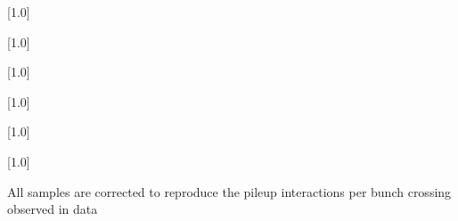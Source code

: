 \begin{table}[!p]
 \centering
{}
 \scriptsize
 \scalebox{.7}[1.0]{}
\label{datasets_dm_scalarw}
\end{table}

\begin{table}[!p]
 \centering
{}
 \scriptsize
 \scalebox{.7}[1.0]{}
\label{datasets_dm_pseudoscalar}
\end{table}

\begin{table}[!p]
 \centering
{}
 \scriptsize
 \scalebox{.7}[1.0]{}
\label{datasets_dm_bbar_pseudoscalar}
\end{table}

\begin{table}[!p]
 \centering
{}
 \scriptsize
 \scalebox{.7}[1.0]{}
\label{datasets_dm_bbar_pseudoscalar}
\end{table}

\begin{table}[!p]
 \centering
 \scriptsize
 \scalebox{.7}[1.0]{}
\label{datasets_dm_ttbar_scalar}
\end{table}

\begin{table}[!p]
 \centering
 \scriptsize
 \scalebox{.7}[1.0]{}
 \label{tab:datasets_dm_ttbar_pseudoscalar}
\end{table}



All samples are corrected to reproduce the pileup interactions per bunch crossing observed in data

